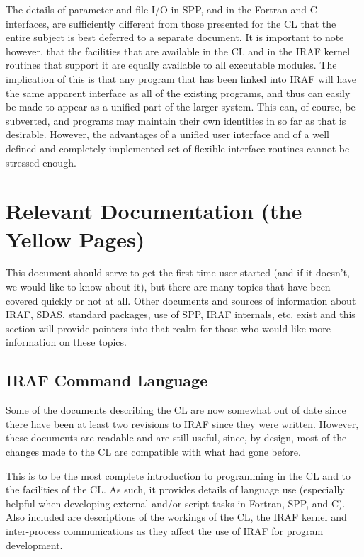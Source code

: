 The details of parameter and file I/O in SPP, and in the Fortran and
C interfaces, are sufficiently different from those presented for the 
CL that the entire subject is best deferred to a separate document.  
It is important to note however, that the facilities that are available
in the CL and in the IRAF kernel routines that support it are
equally available to all executable modules.  The implication of
this is that any program that has been linked into IRAF will have the
same apparent interface as all of the existing programs, and thus
can easily be made to appear as a unified part of the larger system.
This can, of course, be subverted, and programs may maintain their
own identities in so far as that is desirable.  However, the advantages
of a unified user interface and of a well defined and completely
implemented set of flexible interface routines cannot be stressed enough.

\newpage
\section{Relevant Documentation (the Yellow Pages)}

This document should serve to get the first-time user started (and if it
doesn't, we would like to know about it), but there are many topics 
that have been covered quickly or not at all.  Other documents and
sources of information about IRAF, SDAS, standard packages, use of
SPP, IRAF internals, etc. exist and this section will provide pointers
into that realm for those who would like more information on these topics.

\subsection{IRAF Command Language}

Some of the documents describing the CL are now somewhat out of date
since there have been at least two revisions to IRAF since they were
written.  However, these documents are readable and are still
useful, since, by design, most of the changes made to the CL are 
compatible with what had gone before.

\noindent
{}

This is to be the most complete introduction to programming in the
CL and to the facilities of the CL.  As such, it provides details of language
use (especially helpful when developing external and/or script tasks in
Fortran, SPP, and C).  Also included are descriptions of the workings of 
the CL, the IRAF kernel and inter-process communications as they affect 
the use of IRAF for program development.


